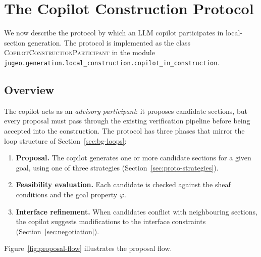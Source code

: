 \documentclass[11pt]{article}
\newcommand{\CCP}{\textsc{CopilotConstructionParticipant}}
\begin{document}
\section{The Copilot Construction Protocol}\label{sec:protocol}

We now describe the protocol by which an LLM copilot participates in
local-section generation.  The protocol is implemented as the class
\CCP{} in the module
\texttt{jugeo.generation.local\_construction.copilot\_in\_construction}.

\subsection{Overview}\label{sec:proto-overview}

The copilot acts as an \emph{advisory participant}: it proposes
candidate sections, but every proposal must pass through the existing
verification pipeline before being accepted into the construction.
The protocol has three phases that mirror the loop structure of
Section~\ref{sec:bg-loops}:

\begin{enumerate}
  \item \textbf{Proposal.}  The copilot generates one or more
        candidate sections for a given goal, using one of three
        strategies (Section~\ref{sec:proto-strategies}).
  \item \textbf{Feasibility evaluation.}  Each candidate is checked
        against the sheaf conditions and the goal property $\varphi$.
  \item \textbf{Interface refinement.}  When candidates conflict with
        neighbouring sections, the copilot suggests modifications to
        the interface constraints
        (Section~\ref{sec:negotiation}).
\end{enumerate}

Figure~\ref{fig:proposal-flow} illustrates the proposal flow.
\end{document}
